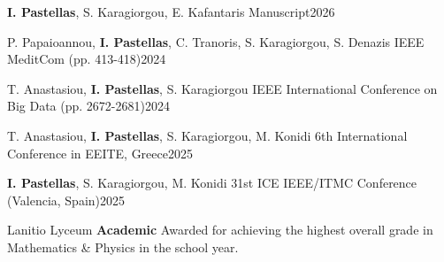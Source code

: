 \documentclass[
	a4paper,
	sidecolor=sidebargray,       %
	sectioncolor=sage,           %
	subsectioncolor=darksage,    %
	itemtextcolor=black!90,      %
	profilepicstyle=profilelogo, %
	profilepicsize=3.5cm,        %
]{ipastellas}                    %
\begin{document}
\begin{cvtable}
    {\textbf{I. Pastellas}, S. Karagiorgou, E. Kafantaris}
    {Manuscript}{2026}

    {P. Papaioannou, \textbf{I. Pastellas}, C. Tranoris, S. Karagiorgou, S. Denazis}
	{IEEE MeditCom (pp. 413-418)}{2024}

    {T. Anastasiou, \textbf{I. Pastellas}, S. Karagiorgou}
    {IEEE International Conference on Big Data (pp. 2672-2681)}{2024}

    {T. Anastasiou, \textbf{I. Pastellas}, S. Karagiorgou, M. Konidi}
    {6th International Conference in EEITE, Greece}{2025}

    {\textbf{I. Pastellas}, S. Karagiorgou, M. Konidi}
    {31st ICE IEEE/ITMC Conference (Valencia, Spain)}{2025}
\end{cvtable}

\begin{cvtable}
    {Lanitio Lyceum \hfill \textbf{Academic}}
    {Awarded for achieving the highest overall grade in Mathematics \& Physics in the school year.}
\end{cvtable}
\end{document}
